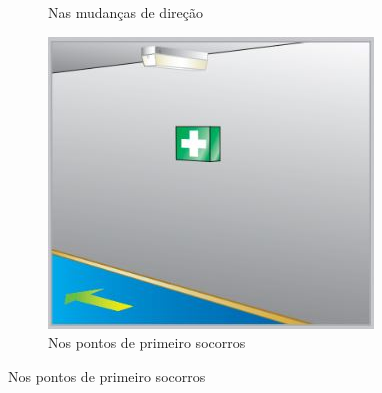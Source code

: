 \begin{figure}[H]
\begin{subfigure}[b]{0.3\textwidth}
			\caption{Nas mudanças de direção}
			\label{fig: style 1 image e}
		\end{subfigure}
		\hfill
		\begin{subfigure}[b]{0.3\textwidth}
			\centering
			\includegraphics[width=\textwidth]{Figures/3. Lighting/light-safety6.jpg}
			\caption{Nos pontos de primeiro socorros}
			\label{fig: style 1 image f}
		\end{subfigure}
	\end{figure}

